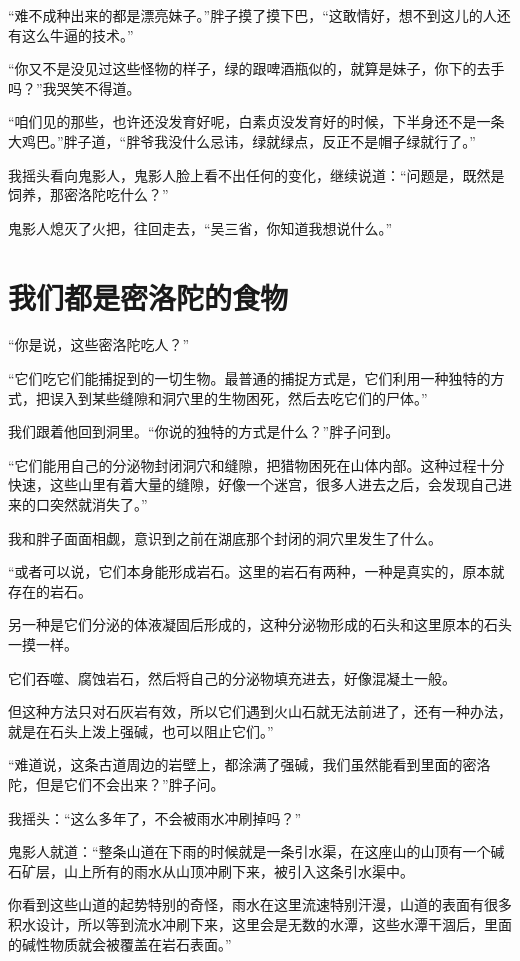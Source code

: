 “难不成种出来的都是漂亮妹子。”胖子摸了摸下巴，“这敢情好，想不到这儿的人还有这么牛逼的技术。”

“你又不是没见过这些怪物的样子，绿的跟啤酒瓶似的，就算是妹子，你下的去手吗？”我哭笑不得道。

“咱们见的那些，也许还没发育好呢，白素贞没发育好的时候，下半身还不是一条大鸡巴。”胖子道，“胖爷我没什么忌讳，绿就绿点，反正不是帽子绿就行了。”

我摇头看向鬼影人，鬼影人脸上看不出任何的变化，继续说道：“问题是，既然是饲养，那密洛陀吃什么？”

鬼影人熄灭了火把，往回走去，“吴三省，你知道我想说什么。”

\chapter{我们都是密洛陀的食物}

“你是说，这些密洛陀吃人？”

“它们吃它们能捕捉到的一切生物。最普通的捕捉方式是，它们利用一种独特的方式，把误入到某些缝隙和洞穴里的生物困死，然后去吃它们的尸体。”

我们跟着他回到洞里。“你说的独特的方式是什么？”胖子问到。

“它们能用自己的分泌物封闭洞穴和缝隙，把猎物困死在山体内部。这种过程十分快速，这些山里有着大量的缝隙，好像一个迷宫，很多人进去之后，会发现自己进来的口突然就消失了。”

我和胖子面面相觑，意识到之前在湖底那个封闭的洞穴里发生了什么。

“或者可以说，它们本身能形成岩石。这里的岩石有两种，一种是真实的，原本就存在的岩石。

另一种是它们分泌的体液凝固后形成的，这种分泌物形成的石头和这里原本的石头一摸一样。

它们吞噬、腐蚀岩石，然后将自己的分泌物填充进去，好像混凝土一般。

但这种方法只对石灰岩有效，所以它们遇到火山石就无法前进了，还有一种办法，就是在石头上泼上强碱，也可以阻止它们。”

“难道说，这条古道周边的岩壁上，都涂满了强碱，我们虽然能看到里面的密洛陀，但是它们不会出来？”胖子问。

我摇头：“这么多年了，不会被雨水冲刷掉吗？”

鬼影人就道：“整条山道在下雨的时候就是一条引水渠，在这座山的山顶有一个碱石矿层，山上所有的雨水从山顶冲刷下来，被引入这条引水渠中。

你看到这些山道的起势特别的奇怪，雨水在这里流速特别汗漫，山道的表面有很多积水设计，所以等到流水冲刷下来，这里会是无数的水潭，这些水潭干涸后，里面的碱性物质就会被覆盖在岩石表面。”

